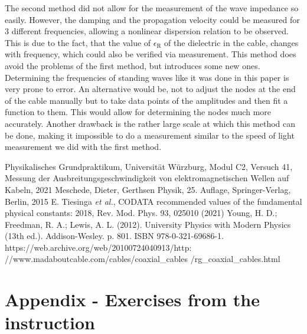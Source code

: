 \documentclass[a4paper,10pt,twocolumn]{article}
\begin{document}
    The second method did not allow for the measurement of the wave impedance so easily.
    However, the damping and the propagation velocity could be measured for 3 different frequencies, allowing a nonlinear dispersion relation to be observed.
    This is due to the fact, that the value of $\epsilon_{\text{R}}$ of the dielectric in the cable, changes with frequency, which could also be verified via measurement.
    This method does avoid the problems of the first method, but introduces some new ones.
    Determining the frequencies of standing waves like it was done in this paper is very prone to error.
    An alternative would be, not to adjust the nodes at the end of the cable manually but to take data points of the amplitudes and then fit a function to them.
    This would allow for determining the nodes much more accurately.
    Another drawback is the rather large scale at which this method can be done, making it impossible to do a measurement similar to the speed of light measurement we did with the first method.
    \begin{thebibliography}  
         Physikalisches Grundpraktikum, Universität Würzburg, Modul C2, Versuch 41, \grqq Messung der Ausbreitungsgeschwindigkeit von elektromagnetischen Wellen auf Kabeln\grqq, 2021
         Meschede, Dieter, Gerthsen Physik, 25. Auflage, Springer-Verlag, Berlin, 2015
         E. Tiesinga \textit{et al.}, \grqq CODATA recommended values of the fundamental physical constants: 2018\grqq, Rev. Mod. Phys. 93, 025010 (2021)
         Young, H. D.; Freedman, R. A.; Lewis, A. L. (2012). University Physics with Modern Physics (13th ed.). Addison-Wesley. p. 801. ISBN 978-0-321-69686-1.
         https://web.archive.org/web/20100724040913/http: //www.madaboutcable.com/cables/coaxial_cables 
        \newline /rg_coaxial_cables.html 
        \newline
    \end{thebibliography}
    \clearpage
    \section{Appendix - Exercises from the instruction}\label{sec:appendix}
\end{document}
